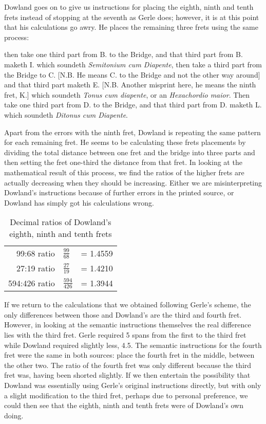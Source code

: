 Dowland goes on to give us instructions for placing the eighth, ninth and tenth frets
instead of stopping at the seventh as Gerle does; however, it is at this point that his
calculations go awry.  He places the remaining three frets using the same process:
\begin{blocks}
then take one third part from B. to the Bridge, and that third part from B. maketh I.
which soundeth \emph{Semitonium cum Diapente}, then take a third part from the Bridge
to C. [N.B. He means C. to the Bridge and not the other way around] and that third part
maketh E. [N.B. Another misprint here, he means the ninth fret, K.] which soundeth
\emph{Tonus cum diapente}, or an \emph{Hexachordio maior}.  Then take one third part
from D. to the Bridge, and that third part from D. maketh L.  which soundeth
\emph{Ditonus cum Diapente}.
\end{blocks}
Apart from the errors with the ninth fret, Dowland is repeating the same pattern for
each remaining fret.  He seems to be calculating these frets placements by dividing the
total distance between one fret and the bridge into three parts and then setting the
fret one-third the distance from that fret.  In looking at the mathematical result of
this process, we find the ratios of the higher frets are actually decreasing when they
should be increasing.  Either we are misinterpreting Dowland's instructions because of
further errors in the printed source, or Dowland has simply got his calculations wrong.

\begin{table}[h!]
    \begin{center}
    \begin{tabular}{ r l l }
        99:68 ratio   & $ \frac{99}{68}   $ &  = 1.4559 \\
        27:19 ratio   & $ \frac{27}{19}   $ &  = 1.4210 \\
        594:426 ratio & $ \frac{594}{426} $ &  = 1.3944 \\
    \end{tabular}
    \end{center}
    \caption{Decimal ratios of Dowland's eighth, ninth and tenth frets}
\end{table}

If we return to the calculations that we obtained following Gerle's scheme, the only
differences between those and Dowland's are the third and fourth fret. However, in
looking at the semantic instructions themselves the real difference lies with the third
fret.  Gerle required 5 spans from the first to the third fret while Dowland required
slightly less, 4.5.  The semantic instructions for the fourth fret were the same in
both sources: place the fourth fret in the middle, between the other two.  The ratio of
the fourth fret was only different because the third fret was, having been shorted
slightly.  If we then entertain the possibility that Dowland was essentially using
Gerle's original instructions directly, but with only a slight modification to the
third fret, perhaps due to personal preference, we could then see that the eighth,
ninth and tenth frets were of Dowland's own doing.

